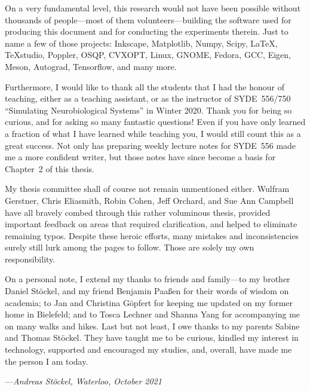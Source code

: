 On a very fundamental level, this research would not have been possible without thousands of people---most of them volunteers---building the software used for producing this document and for conducting the experiments therein. Just to name a few of those projects: Inkscape, Matplotlib, Numpy, Scipy, \LaTeX, \TeX studio, Poppler, OSQP, CVXOPT, Linux, GNOME, Fedora, GCC, Eigen, Meson, Autograd, Tensorflow, and many more.

Furthermore, I would like to thank all the students that I had the honour of teaching, either as a teaching assistant, or as the instructor of SYDE~556/750 \enquote{Simulating Neurobiological Systems} in Winter 2020.
Thank you for being so curious, and for asking so many fantastic questions!
Even if you have only learned a fraction of what I have learned while teaching you, I would still count this as a great success.
Not only has preparing weekly lecture notes for SYDE~556 made me a more confident writer, but those notes have since become a basis for Chapter~2 of this thesis.

My thesis committee shall of course not remain unmentioned either.
Wulfram Gerstner, Chris Eliasmith, Robin Cohen, Jeff Orchard, and Sue Ann Campbell have all bravely combed through this rather voluminous thesis, provided important feedback on areas that required clarification, and helped to eliminate remaining typos.
Despite these heroic efforts, many mistakes and inconsistencies surely still lurk among the pages to follow.
Those are solely my own responsibility.

On a personal note, I extend my thanks to friends and family---to my brother Daniel Stöckel, and my friend Benjamin Paaßen for their words of wisdom on academia; to Jan and Christina Göpfert for keeping me updated on my former home in Bielefeld; and to Tosca Lechner and Shanna Yang for accompanying me on many walks and hikes.
Last but not least, I owe thanks to my parents Sabine and Thomas Stöckel.
They have taught me to be curious, kindled my interest in technology, supported and encouraged my studies, and, overall, have made me the person I am today.

\bigskip

{
\raggedleft
---\emph{Andreas Stöckel, Waterloo, October 2021}\\
}
